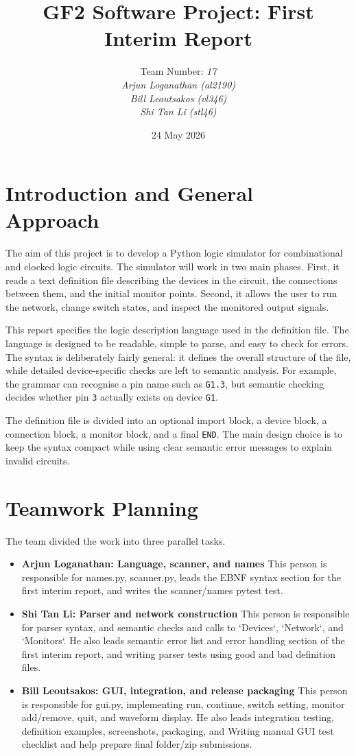 \documentclass[10pt,a4paper]{article}
\title{GF2 Software Project: First Interim Report}
\author{
Team Number: \textit{17}\\
\textit{Arjun Loganathan (al2190)}\\
\textit{Bill Leoutsakos (vl346)}\\
\textit{Shi Tan Li (stl46)}
}
\date{24 May 2026}
\begin{document}
\maketitle

\section{Introduction and General Approach}

The aim of this project is to develop a Python logic simulator for
combinational and clocked logic circuits. The simulator will work in two main
phases. First, it reads a text definition file describing the devices in the
circuit, the connections between them, and the initial monitor points. Second,
it allows the user to run the network, change switch states, and inspect the
monitored output signals.

This report specifies the logic description language used in the definition
file. The language is designed to be readable, simple to parse, and easy to
check for errors. The syntax is deliberately fairly general: it defines the
overall structure of the file, while detailed device-specific checks are left
to semantic analysis. For example, the grammar can recognise a pin name such as
\texttt{G1.3}, but semantic checking decides whether pin \texttt{3} actually
exists on device \texttt{G1}.

The definition file is divided into an optional import block, a device block, a
connection block, a monitor block, and a final \texttt{END}. The main design
choice is to keep the syntax compact while using clear semantic error messages
to explain invalid circuits.

\section{Teamwork Planning}

The team divided the work into three parallel tasks.

\begin{itemize}
    \item \textbf{Arjun Loganathan: Language, scanner, and names}
    This person is responsible for names.py, scanner.py, leads the EBNF syntax section for the first interim report, and writes the scanner/names pytest test.

    \item \textbf{Shi Tan Li: Parser and network construction}
    This person is responsible for parser syntax, and semantic checks and calls to `Devices`, `Network`, and `Monitors`. He also leads semantic error list and error handling section of the first interim report, and writing parser tests using good and bad definition files.

    \item \textbf{Bill Leoutsakos: GUI, integration, and release packaging}
    This person is responsible for gui.py, implementing run, continue, switch setting, monitor add/remove, quit, and waveform display. He also leads integration testing, definition examples, screenshots, packaging, and Writing manual GUI test checklist and help prepare final folder/zip submissions.
\end{itemize}
\end{document}
